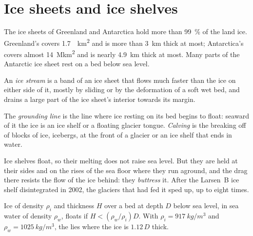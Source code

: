 \section{Ice sheets and ice shelves}\label{sec:b3:glaciology:ice-sheets}

The ice sheets of Greenland and Antarctica hold more than
\qty{99}{\percent} of the land ice. Greenland's covers \qty{1.7}{\mega
km^2} and is more than \qty{3}{km} thick at most; Antarctica's covers
almost \qty{14}{\mega km^2} and is nearly \qty{4.9}{km} thick at most. Many
parts of the Antarctic ice sheet rest on a bed below sea level.

\begin{definition}\label{def:b3:glaciology:ice-stream}
An \emph{ice stream} is a band of an ice sheet that flows
much faster than the ice on either side of it, mostly by sliding or by the
deformation of a soft wet bed, and drains a large part of the ice sheet's
interior towards its margin.
\end{definition}

\begin{definition}\label{def:b3:glaciology:grounding-line}
The \emph{grounding line} is the line where ice
resting on its bed begins to float: seaward of it the ice is an ice shelf
or a floating glacier tongue. \emph{Calving} is the breaking
off of blocks of ice, icebergs, at the front of a glacier or an ice shelf
that ends in water.
\end{definition}

Ice shelves float, so their melting does not raise sea level. But they are
held at their sides and on the rises of the sea floor where they run
aground, and the drag there resists the flow of the ice behind: they
\emph{buttress} it. After the Larsen~B ice shelf disintegrated in 2002, the
glaciers that had fed it sped up, up to eight times.

\begin{proposition}[Flotation]\label{prop:b3:glaciology:flotation}
Ice of density $\rho_i$ and thickness $H$ over a bed at depth $D$ below sea
level, in sea water of density $\rho_w$, floats if $H < (\rho_w/\rho_i)D$.
With $\rho_i = \qty{917}{kg/m^3}$ and $\rho_w = \qty{1025}{kg/m^3}$, the
 lies where the ice is $1.12\,D$ thick.
\end{proposition}

